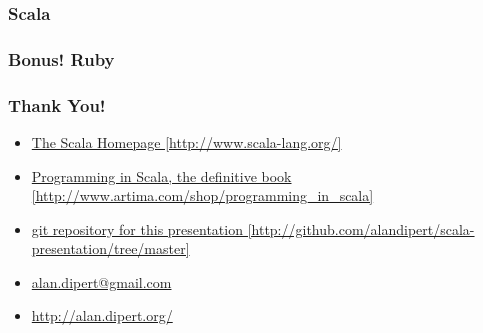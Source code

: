 \begin{frame} 
\frametitle{Scala}
\tt\tiny{

}
\end{frame} 

\begin{frame} 
\frametitle{Bonus! Ruby}
\tt\tiny{

}
\end{frame} 

\begin{frame} 
\frametitle{Thank You!}
\begin{itemize}
  \item<1-> \href{http://www.scala-lang.org/}{The Scala Homepage [http://www.scala-lang.org/]}
  \item<1-> \href{http://www.artima.com/shop/programming\_in\_scala}{Programming in Scala, the definitive book [http://www.artima.com/shop/programming\_in\_scala]}
  \item<1-> \href{http://github.com/alandipert/scala-presentation/tree/master}{git repository for this presentation [http://github.com/alandipert/scala-presentation/tree/master]}
\end{itemize}
\begin{itemize}
  \item<1-> \href{mailto:alan.dipert@gmail.com}{alan.dipert@gmail.com}
  \item<1-> \href{http://alan.dipert.org/}{http://alan.dipert.org/}
\end{itemize}
\end{frame} 

 
